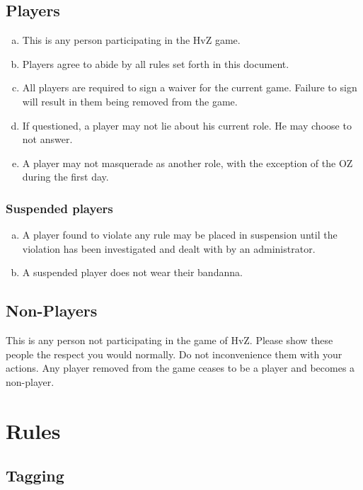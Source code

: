 \documentclass[a4paper,12pt]{article}
\begin{document}
\subsection{Players}

\begin{enumerate}[(a)]
    \item This is any person participating in the HvZ game.
    \item Players agree to abide by all rules set forth in this document.
    \item All players are required to sign a waiver for the current game. Failure to sign will result in them being removed from the game. 
    \item If questioned, a player may not lie about his current role. He may choose to not answer.
    \item A player may not masquerade as another role, with the exception of the OZ during the first day.
\end{enumerate}

\subsubsection{Suspended players}

\begin{enumerate}[(a)]
    \item A player found to violate any rule may be placed in suspension until the violation has been investigated and dealt with by an administrator.
    \item A suspended player does not wear their bandanna.
\end{enumerate}


\subsection{Non-Players}

This is any person not participating in the game of HvZ.
Please show these people the respect you would normally. Do not inconvenience them with your actions.
Any player removed from the game ceases to be a player and becomes a non-player.

\section{Rules}

\subsection{Tagging}
\end{document}
